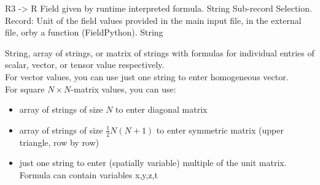 \begin{RecordType}
	{}
	{} %
	{} %
	{} %
	{{{R3 -{\textgreater} R Field given by runtime interpreted formula.}}}
		\KeyItem
			{}
			{{String}}
			{\textrangle}
			{} %
			{{{Sub-record Selection.}}}
		\KeyItem
			{}
			{{Record}{: }}
			{\textrangle}
			{} %
			{{{Unit of the field values provided in the main input file, in the external file, orby a function (FieldPython).}}}
		\KeyItem
			{}
			{{String}}
			{\textrangle}
			{} %
			{{{{String, array of strings, or matrix of strings with formulas for individual entries of scalar, vector, or tensor value respectively.}\\{
For vector values, you can use just one string to enter homogeneous vector.}\\{
For square }{$N\times N$}{-matrix values, you can use:}
}
\begin{itemize}
\item {array of strings of size }{$N$}{ to enter diagonal matrix}
\item {array of strings of size }{$\frac12N(N+1)$}{ to enter symmetric matrix (upper triangle, row by row)}
\item {just one string to enter (spatially variable) multiple of the unit matrix.}\\{
Formula can contain variables }\ttfamily x,y,z,t
\end{itemize}
}}
\end{RecordType}
